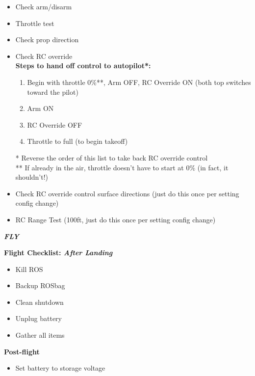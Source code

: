 \documentclass[]{auvsi_doc}
\begin{document}
\begin{itemize}
	\item Check arm/disarm
	\item Throttle test
	\item Check prop direction
	\item Check RC override \\
				\textbf{Steps to hand off control to autopilot*:}
	\begin{enumerate}
		\item Begin with throttle 0\%**, Arm OFF, RC Override ON (both top switches toward the pilot)
		\item Arm ON
		\item RC Override OFF
		\item Throttle to full (to begin takeoff)
	\end{enumerate}
	* Reverse the order of this list to take back RC override control \\
	** If already in the air, throttle doesn't have to start at 0\% (in fact, it shouldn't!)
	\item Check RC override control surface directions (just do this once per setting config change)
	\item RC Range Test (100ft, just do this once per setting config change)
\end{itemize}

\hrulefill

\textit{\textbf{FLY}}

\hrulefill

\textbf{Flight Checklist: \textit{After Landing}}
\begin{itemize}
	\item Kill ROS
	\item Backup ROSbag
	\item Clean shutdown
	\item Unplug battery
	\item Gather all items
\end{itemize}

\hrulefill

\textbf{Post-flight}
\begin{itemize}
	\item Set battery to storage voltage
\end{itemize}
\end{document}
